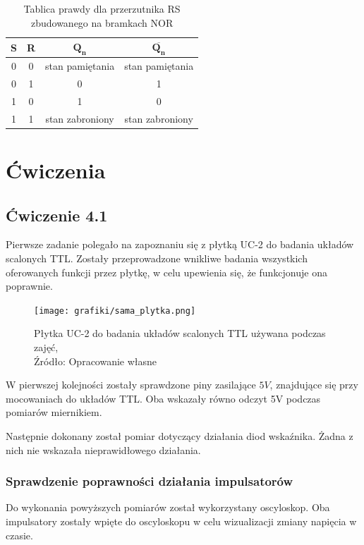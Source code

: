 \documentclass{article}
\begin{document}
      \begin{table}[h]
        \centering
        \begin{tabular}{|c|c|c|c|}
        \hline
        \footnotesize \textbf{S} & \footnotesize \textbf{R} & \footnotesize $\mathbf{Q_n}$ & \footnotesize $\mathbf{\overline{Q_n}}$ \\
        \hline
        0 & 0 & stan pamiętania & stan pamiętania \\
        \hline
        0 & 1 & 0 & 1 \\
        \hline
        1 & 0 & 1 & 0 \\
        \hline
        1 & 1 & stan zabroniony & stan zabroniony \\
        \hline
        \end{tabular}
        \caption{Tablica prawdy dla przerzutnika RS zbudowanego na bramkach NOR}
      \end{table}
        

  \section{Ćwiczenia}
    \subsection{Ćwiczenie 4.1}
    Pierwsze zadanie polegało na zapoznaniu się z płytką UC-2 do badania układów scalonych TTL. Zostały przeprowadzone wnikliwe badania wszystkich oferowanych funkcji przez płytkę, w celu upewienia się, że funkcjonuje ona poprawnie.

    \begin{figure}[!ht]
      \centering
      \texttt{[image: grafiki/sama\_plytka.png]}
      \caption{Płytka UC-2 do badania układów scalonych TTL używana podczas zajęć,
      \\Źródło: Opracowanie własne}
    \end{figure}

    W pierwszej kolejności zostały sprawdzone piny zasilające $5V$, znajdujące się przy mocowaniach do układów TTL. Oba wskazały równo odczyt 5V podczas pomiarów miernikiem.

    Następnie dokonany został pomiar dotyczący działania diod wskaźnika. Żadna z nich nie wskazała nieprawidłowego działania.

    \subsubsection{Sprawdzenie poprawności działania impulsatorów}
      Do wykonania powyższych pomiarów został wykorzystany oscyloskop. Oba impulsatory zostały wpięte do oscyloskopu w celu wizualizacji zmiany napięcia w czasie.
      
\end{document}
